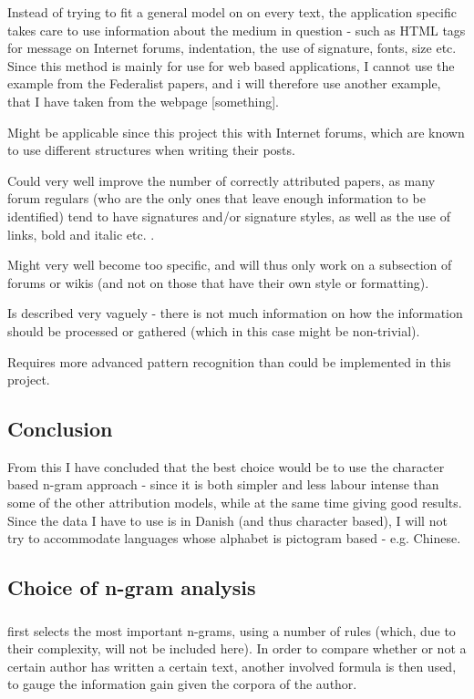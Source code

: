 {\label{application}
Instead of trying to fit a general model on on every text, the application specific takes care to use information about the medium in question - such as HTML tags for message on Internet forums, indentation, the use of signature, fonts, size etc.
}
{
Since this method is mainly for use for web based applications, I cannot use the example from the Federalist papers, and i will therefore use another example, that I have taken from the webpage [something]. 
\q{}
}
{
\item Might be applicable since this project this with Internet forums, which are known to use different structures when writing their posts.
\item Could very well improve the number of correctly attributed papers, as many forum regulars (who are the only ones that leave enough information to be identified) tend to have signatures and/or signature styles, as well as the use of links, bold and italic etc. .
}{
\item Might very well become too specific, and will thus only work on a subsection of forums or wikis (and not on those that have their own style or formatting).
\item Is described very vaguely - there is not much information on how the information should be processed or gathered (which in this case might be non-trivial).
\item Requires more advanced pattern recognition than could be implemented in this project. 
}

\subsection{Conclusion}
\label{technique:conclusion}
From this I have concluded that the best choice would be to use the character based n-gram approach - since it is both simpler and less labour intense than some of the other attribution models, while at the same time giving good results. Since the data I have to use is in Danish (and thus character based), I will not try to accommodate languages whose alphabet is pictogram based - e.g. Chinese.


\subsection{Choice of n-gram analysis}

\subsubsection{\cite{nr3}}
\cite{nr3} first selects the most important n-grams, using a number of rules (which, due to their complexity, will not be included here). In order to compare whether or not a certain author has written a certain text, another involved formula is then used, to gauge the information gain given the corpora of the author.

